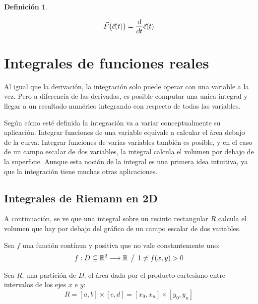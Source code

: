 \documentclass[a5paper,12pt,twoside]{book}
\newtheorem{defn}{{Definición}}[chapter]
\begin{document}
\begin{mdframed}[style=DefinitionFrame]
    \begin{defn}
    \end{defn}
    \begin{equation*}
        \Vec{F} \big( \Vec{c}(t) \big) = \frac{\textsl{d}}{\textsl{d} t} \Vec{c}(t)
    \end{equation*}
\end{mdframed}


\chapter{Integrales de funciones reales}


Al igual que la derivación, la integración solo puede operar con una variable a la vez.
Pero a diferencia de las derivadas, es posible computar una unica integral y llegar a un resultado numérico integrando con respecto de todas las variables.

Según cómo esté definida la integración va a variar conceptualmente su aplicación.
Integrar funciones de una variable equivale a calcular el área debajo de la curva.
Integrar funciones de varias variables también es posible, y en el caso de un campo escalar de dos variables, la integral calcula el volumen por debajo de la superficie.
Aunque esta noción de la integral es una primera idea intuitiva, ya que la integración tiene muchas otras aplicaciones.


\section{Integrales de Riemann en 2D}

A continuación, se ve que una integral sobre un recinto rectangular $R$ calcula el volumen que hay por debajo del gráfico de un campo escalar de dos variables.

Sea $f$ una función contínua y positiva que no vale constantemente uno:
\begin{equation*}
    f:D \subseteq \mathbb{R}^2 \longrightarrow \mathbb{R} \hspace{1ex} \big/ \hspace{1ex} 1 \neq f(x,y) > 0
\end{equation*}

Sea $R$, una partición de $D$, el área dada por el producto cartesiano entre intervalos de los ejes $x$ e $y$:
\begin{equation*}
    R = [a,b] \times [c,d] = [x_0,x_n] \times [y_0,y_n]
\end{equation*}
\end{document}
